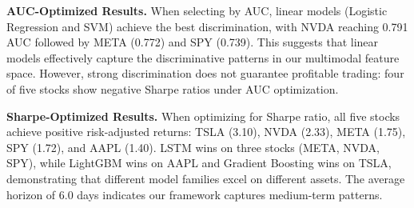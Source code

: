 \documentclass[a4paper,10pt,conference]{IEEEtran}
\begin{document}
\begin{table}[h]
\caption{Best Model Performance by Stock (Selected by Sharpe Ratio)}
\label{tab:results_sharpe}
\centering
{}
\end{table}

\textbf{AUC-Optimized Results.} When selecting by AUC, linear models (Logistic Regression and SVM) achieve the best discrimination, with NVDA reaching 0.791 AUC followed by META (0.772) and SPY (0.739). This suggests that linear models effectively capture the discriminative patterns in our multimodal feature space. However, strong discrimination does not guarantee profitable trading: four of five stocks show negative Sharpe ratios under AUC optimization.

\textbf{Sharpe-Optimized Results.} When optimizing for Sharpe ratio, all five stocks achieve positive risk-adjusted returns: TSLA (3.10), NVDA (2.33), META (1.75), SPY (1.72), and AAPL (1.40). LSTM wins on three stocks (META, NVDA, SPY), while LightGBM wins on AAPL and Gradient Boosting wins on TSLA, demonstrating that different model families excel on different assets. The average horizon of 6.0 days indicates our framework captures medium-term patterns.



\end{document}

